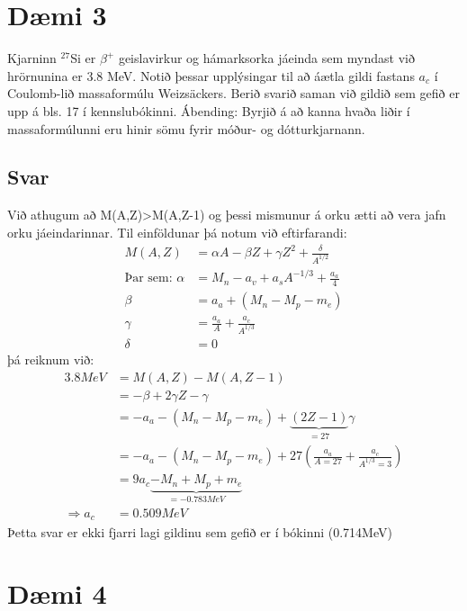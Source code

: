 \documentclass[11pt]{article}
\newcommand{\explain}[2]{\underbrace{#1}_\textrm{$#2$}}
\begin{document}
\section*{Dæmi 3}
Kjarninn $^27$Si er $\beta^+$ geislavirkur og hámarksorka jáeinda sem myndast við hrörnunina er 3.8 MeV. Notið þessar upplýsingar til að áætla gildi fastans $a_c$ í Coulomb-lið massaformúlu Weizsäckers. Berið svarið saman við gildið sem gefið er upp á bls. 17 í kennslubókinni. Ábending: Byrjið á að kanna hvaða liðir í massaformúlunni eru hinir sömu fyrir móður- og dótturkjarnann.

\subsection*{Svar}
Við athugum að M(A,Z)>M(A,Z-1) og þessi mismunur á orku ætti að vera jafn orku jáeindarinnar. Til einföldunar þá notum við eftirfarandi:
\begin{align*}
    M(A,Z) &= \alpha A - \beta Z + \gamma Z^2 + \frac{\delta}{A^{1/2}}\\
    \text{Þar sem:   } \alpha  &= M_n -a_v +a_sA^{-1/3} + \frac{a_a}{4}\\
                    \beta   &= a_a + (M_n - M_p - m_e)\\
                    \gamma  &= \frac{a_a}{A} + \frac{a_c}{A^{1/3}}\\
                    \delta  &= 0
\end{align*}
þá reiknum við:
\begin{align*}
   3.8MeV   &= M(A,Z)-M(A,Z-1) \\
            &=-\beta + 2\gamma Z - \gamma\\
            &= -a_a - (M_n - M_p - m_e) +\explain{(2Z-1)}{=27}\gamma\\
            &= -a_a - (M_n - M_p - m_e) + 27\left(\frac{a_a}{A=27}+\frac{a_c}{A^{1/3}=3}\right)\\
            &= 9a_c \explain{- M_n + M_p + m_e}{= -0.783 MeV}\\
            \Rightarrow a_c &= 0.509 MeV
\end{align*}
Þetta svar er ekki fjarri lagi gildinu sem gefið er í bókinni (0.714MeV)

\section*{Dæmi 4}
\end{document}
